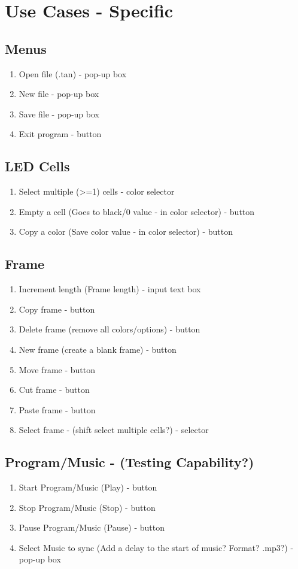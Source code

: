 \documentclass[12pt,a4paper]{article}
\begin{document}
\section*{Use Cases - Specific}	

\subsection*{Menus}
\begin{enumerate}
	\item Open file (.tan) - pop-up box
	\item New file - pop-up box
	\item Save file - pop-up box
	\item Exit program - button
\end{enumerate}

\subsection*{LED Cells}
\begin{enumerate}
	\item Select multiple (>=1) cells - color selector
	\item Empty a cell (Goes to black/0 value - in color selector) - button
	\item Copy a color (Save color value - in color selector) - button
\end{enumerate}

\subsection*{Frame}
\begin{enumerate}
	\item Increment length (Frame length) - input text box
	\item Copy frame - button
	\item Delete frame (remove all colors/options) - button
	\item New frame (create a blank frame) - button 
	\item Move frame - button
	\item Cut frame - button
	\item Paste frame - button
	\item Select frame - (shift select multiple cells?) - selector
\end{enumerate}

\subsection*{Program/Music - (Testing Capability?)}
\begin{enumerate}
	\item Start Program/Music (Play) - button
	\item Stop Program/Music (Stop) - button
	\item Pause Program/Music (Pause) - button 
	\item Select Music to sync (Add a delay to the start of music? Format? .mp3?) - pop-up box
\end{enumerate}
\end{document}
